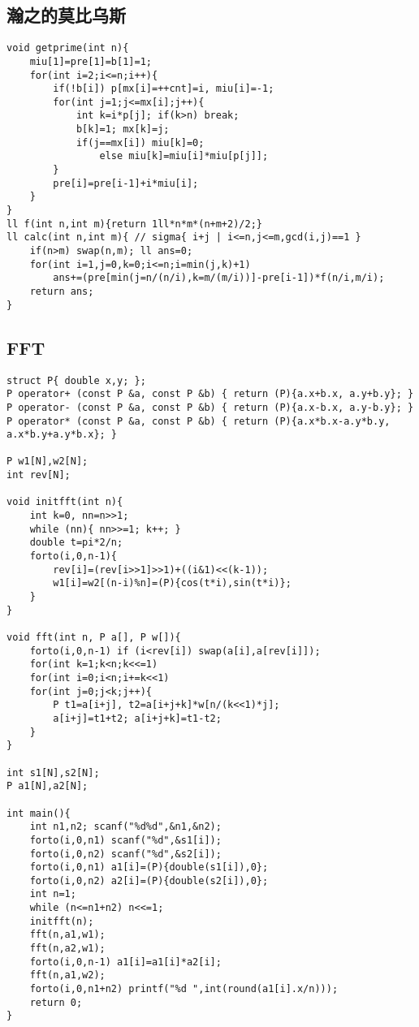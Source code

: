 \documentclass{article}
\begin{document}
\subsection{瀚之的莫比乌斯}
\begin{lstlisting}
void getprime(int n){
	miu[1]=pre[1]=b[1]=1;
	for(int i=2;i<=n;i++){
		if(!b[i]) p[mx[i]=++cnt]=i, miu[i]=-1;
		for(int j=1;j<=mx[i];j++){
			int k=i*p[j]; if(k>n) break;
			b[k]=1; mx[k]=j;
			if(j==mx[i]) miu[k]=0;
				else miu[k]=miu[i]*miu[p[j]];
		}
		pre[i]=pre[i-1]+i*miu[i];
	}
}
ll f(int n,int m){return 1ll*n*m*(n+m+2)/2;} 
ll calc(int n,int m){ // sigma{ i+j | i<=n,j<=m,gcd(i,j)==1 }
	if(n>m) swap(n,m); ll ans=0;
	for(int i=1,j=0,k=0;i<=n;i=min(j,k)+1)
		ans+=(pre[min(j=n/(n/i),k=m/(m/i))]-pre[i-1])*f(n/i,m/i);
	return ans;
}
\end{lstlisting}

\subsection{FFT}
\begin{lstlisting}
struct P{ double x,y; };
P operator+ (const P &a, const P &b) { return (P){a.x+b.x, a.y+b.y}; }
P operator- (const P &a, const P &b) { return (P){a.x-b.x, a.y-b.y}; }
P operator* (const P &a, const P &b) { return (P){a.x*b.x-a.y*b.y, a.x*b.y+a.y*b.x}; }

P w1[N],w2[N];
int rev[N];

void initfft(int n){
	int k=0, nn=n>>1;
	while (nn){ nn>>=1; k++; }
	double t=pi*2/n;
	forto(i,0,n-1){
		rev[i]=(rev[i>>1]>>1)+((i&1)<<(k-1));
		w1[i]=w2[(n-i)%n]=(P){cos(t*i),sin(t*i)};
	}
}

void fft(int n, P a[], P w[]){
	forto(i,0,n-1) if (i<rev[i]) swap(a[i],a[rev[i]]);
	for(int k=1;k<n;k<<=1)
	for(int i=0;i<n;i+=k<<1)
	for(int j=0;j<k;j++){
		P t1=a[i+j], t2=a[i+j+k]*w[n/(k<<1)*j];
		a[i+j]=t1+t2; a[i+j+k]=t1-t2;
	}
}

int s1[N],s2[N];
P a1[N],a2[N];

int main(){
	int n1,n2; scanf("%d%d",&n1,&n2);
	forto(i,0,n1) scanf("%d",&s1[i]);
	forto(i,0,n2) scanf("%d",&s2[i]);
	forto(i,0,n1) a1[i]=(P){double(s1[i]),0};
	forto(i,0,n2) a2[i]=(P){double(s2[i]),0};
	int n=1;
	while (n<=n1+n2) n<<=1;
	initfft(n);
	fft(n,a1,w1);
	fft(n,a2,w1);
	forto(i,0,n-1) a1[i]=a1[i]*a2[i];
	fft(n,a1,w2);
	forto(i,0,n1+n2) printf("%d ",int(round(a1[i].x/n)));
	return 0;
}
\end{lstlisting}
\end{document}
